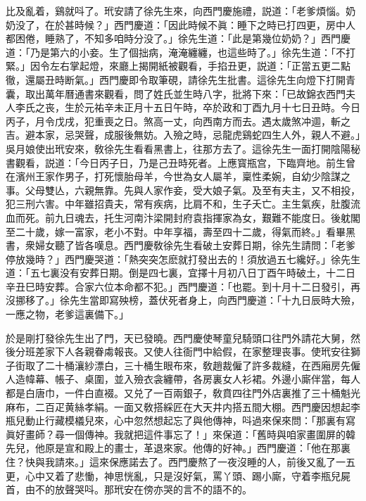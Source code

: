 比及亂着，鷄就呌了。玳安請了徐先生來，向西門慶施禮，説道：「老爹煩惱。奶奶没了，在於甚時候？」西門慶道：「因此時候不眞：睡下之時已打四更，房中人都困倦，睡熟了，不知多咱時分没了。」徐先生道：「此是第幾位奶奶？」西門慶道：「乃是第六的小妾。生了個拙病，淹淹纏纏，也這些時了。」徐先生道：「不打緊。」因令左右掌起燈，來廳上揭開紙被觀看，手掐丑更，説道：「正當五更二點徹，還屬丑時断氣。」西門慶即令取筆硯，請徐先生批書。這徐先生向燈下打開青囊，取出萬年曆通書來觀看，問了姓氏並生時八字，批將下來：「已故錦衣西門夫人李氏之丧，生於元祐辛未正月十五日午時，卒於政和丁酉九月十七日丑時。今日丙子，月令戊戌，犯重喪之日。煞高一丈，向西南方而去。遇太歲煞冲逥，斬之吉。避本家，忌哭聲，成服後無妨。入殮之時，忌龍虎鷄蛇四生人外，親人不避。」吳月娘使出玳安來，敎徐先生看看黑書上，往那方去了。這徐先生一面打開陰陽秘書觀看，説道：「今日丙子日，乃是己丑時死者。上應寳瓶宫，下臨齊地。前生曾在濱州王家作男子，打死懷胎母羊，今世為女人屬羊，稟性柔婉，自幼少陰謀之事。父母雙亾，六親無靠。先與人家作妾，受大娘子氣。及至有夫主，又不相投，犯三刑六害。中年雖招貴夫，常有疾病，比肩不和，生子夭亡。主生氣疾，肚腹流血而死。前九日魂去，托生河南汴梁開封府袁指揮家為女，艱難不能度日。後躭閣至二十歲，嫁一富家，老小不對。中年享福，壽至四十二歲，得氣而終。」看畢黑書，衆婦女聽了皆各嘆息。西門慶敎徐先生看破土安葬日期，徐先生請問：「老爹停放幾時？」西門慶哭道：「熱突突怎麽就打發出去的！須放過五七纔好。」徐先生道：「五七裏没有安葬日期。倒是四七裏，宜擇十月初八日丁酉午時破土，十二日辛丑巳時安葬。合家六位本命都不犯。」西門慶道：「也罷。到十月十二日發引，再沒挪移了。」徐先生當即寫殃榜，蓋伏死者身上，向西門慶道：「十九日辰時大殮，一應之物，老爹這裏備下。」

於是剛打發徐先生出了門，天已發曉。西門慶使琴童兒騎頭口往門外請花大舅，然後分班差家下人各親眷䖏報丧。又使人往衙門中給假，在家整理丧事。使玳安往獅子街取了二十桶瀼紗漂白，三十桶生眼布來，敎趙裁僱了許多裁縫，在西廂房先僱人造幃幕、帳子、桌圍，並入殮衣衾纏帶，各房裏女人衫裙。外邊小廝伴當，每人都是白唐巾，一件白直裰。又兑了一百兩銀子，敎賁四往門外店裏推了三十桶魁光麻布，二百疋黄絲孝絹。一面又敎搭綵匠在大天井内搭五間大棚。西門慶因想起李瓶兒動止行藏模檥兒來，心中忽然想起忘了與他傳神，呌過來保來問：「那裏有寫眞好畫師？尋一個傳神。我就把這件事忘了！」來保道：「舊時與咱家畫圍屏的韓先兒，他原是宣和殿上的畫士，革退來家。他傳的好神。」西門慶道：「他在那裏住？快與我請來。」這來保應諾去了。西門慶熬了一夜沒睡的人，前後又亂了一五更，心中又着了悲慟，神思恍亂，只是沒好氣，罵丫頭、踢小廝，守着李瓶兒屍首，由不的放聲哭呌。那玳安在傍亦哭的言不的語不的。

